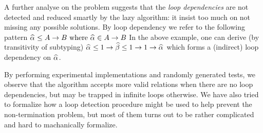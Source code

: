 
A further analyse on the problem suggests that the \emph{loop dependencies} are not detected
and reduced smartly by the lazy algorithm:
it insist too much on not missing any possible solutions.
By loop dependency we refer to the following pattern
$\al \le A \to B \text{ where } \al \in A \to B$
In the above example, one can derive (by transitivity of subtyping)
$\al \le 1 \to \bt \le 1 \to 1 \to \al$
which forms a (indirect) loop dependency on $\al$.

By performing experimental implementations and randomly generated tests,
we observe that the algorithm accepts more valid relations when there are no loop dependencies,
but may be trapped in infinite loops otherwise.
We have also tried to formalize how a loop detection procedure might be used to help
prevent the non-termination problem,
but most of them turns out to be rather complicated and hard to machanically formalize.


